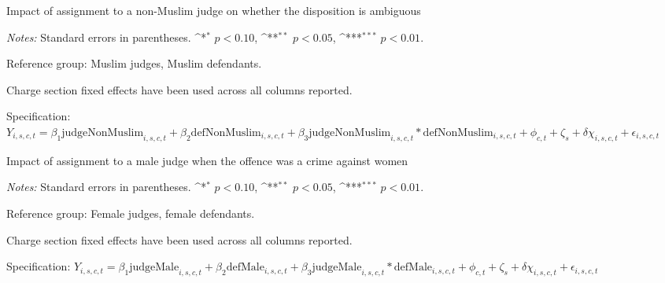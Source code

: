 \documentclass[12pt,english]{article}
\def\sym#1{\ifmmode^{#1}\else\(^{#1}\)\fi}
\begin{document}
\begin{appendices}
\begin{landscape}
\begin{table}
  \begin{center}
     \caption{Impact of assignment to a non-Muslim judge on whether the disposition is ambiguous}
      \label{tab:robust_amb_Muslim}
     
    \end{center}
    \begin{minipage}{1.6\textwidth}
        \footnotesize 
        \emph{Notes:} Standard errors in parentheses. \sym{*} \(p<0.10\), \sym{**} \(p<0.05\), \sym{***} \(p<0.01\).  \par 
        Reference group: Muslim judges, Muslim defendants.  \par
        Charge section fixed effects have been used across all columns reported. \par
        Specification: $Y_{i,s,c,t} = \beta_{1} \text{judgeNonMuslim}_{i,s,c,t} + \beta_{2} \text{defNonMuslim}_{i,s,c,t} + \beta_{3} \text{judgeNonMuslim}_{i,s,c,t} * \text{defNonMuslim}_{i,s,c,t} + \phi_{c,t} + \zeta_{s} + \delta \chi_{i,s,c,t} + \epsilon_{i,s,c,t}$  \par
   \end{minipage}
\end{table}

\begin{table}[ht!]
      \begin{center}
        \caption{Impact of assignment to a male judge when the offence was a crime against women}
        \label{tab:crime_women}
        
      \end{center}
    \begin{minipage}{1.6\textwidth}
        \footnotesize 
        \emph{Notes:} Standard errors in parentheses. \sym{*} \(p<0.10\), \sym{**} \(p<0.05\), \sym{***} \(p<0.01\).  \par 
        Reference group: Female judges, female defendants.  \par
        Charge section fixed effects have been used across all columns reported. \par
        Specification: $Y_{i,s,c,t} = \beta_{1} \text{judgeMale}_{i,s,c,t} + \beta_{2} \text{defMale}_{i,s,c,t} + \beta_{3} \text{judgeMale}_{i,s,c,t} * \text{defMale}_{i,s,c,t} + \phi_{c,t} + \zeta_{s} + \delta \chi_{i,s,c,t} + \epsilon_{i,s,c,t}$ \par
   \end{minipage}
\end{table}


\end{landscape}
\end{appendices}
\end{document}
